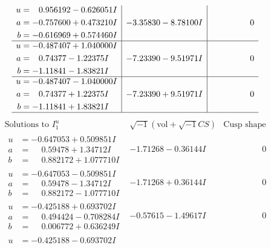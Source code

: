 \documentclass[1p]{elsarticle_modified}
\theoremstyle{definition}
\newcommand{\I}{\sqrt{-1}}
\begin{document}
$$\begin{array}{c|c|c}
\begin{aligned}
u &= \phantom{-}0.956192 - 0.626051 I \\
a &= -0.757600 + 0.473210 I \\
b &= -0.616969 + 0.574460 I\end{aligned}
 & -3.35830 - 8.78100 I & \phantom{-0.000000 } 0 \\ \hline\begin{aligned}
u &= -0.487407 + 1.040000 I \\
a &= \phantom{-}0.74377 - 1.22375 I \\
b &= -1.11841 - 1.83821 I\end{aligned}
 & -7.23390 - 9.51971 I & \phantom{-0.000000 } 0 \\ \hline\begin{aligned}
u &= -0.487407 - 1.040000 I \\
a &= \phantom{-}0.74377 + 1.22375 I \\
b &= -1.11841 + 1.83821 I\end{aligned}
 & -7.23390 + 9.51971 I & \phantom{-0.000000 } 0\\
 \hline 
 \end{array}$$\newpage$$\begin{array}{c|c|c}  
\text{Solutions to }I^u_{1}& \I (\text{vol} + \sqrt{-1}CS) & \text{Cusp shape}\\
 \hline 
\begin{aligned}
u &= -0.647053 + 0.509851 I \\
a &= \phantom{-}0.59478 + 1.34712 I \\
b &= \phantom{-}0.882172 + 1.077710 I\end{aligned}
 & -1.71268 - 0.36144 I & \phantom{-0.000000 } 0 \\ \hline\begin{aligned}
u &= -0.647053 - 0.509851 I \\
a &= \phantom{-}0.59478 - 1.34712 I \\
b &= \phantom{-}0.882172 - 1.077710 I\end{aligned}
 & -1.71268 + 0.36144 I & \phantom{-0.000000 } 0 \\ \hline\begin{aligned}
u &= -0.425188 + 0.693702 I \\
a &= \phantom{-}0.494424 - 0.708284 I \\
b &= \phantom{-}0.006772 + 0.636249 I\end{aligned}
 & -0.57615 - 1.49617 I & \phantom{-0.000000 } 0 \\ \hline\begin{aligned}
u &= -0.425188 - 0.693702 I \\

\end{aligned}
\end{array}$$
\end{document}
